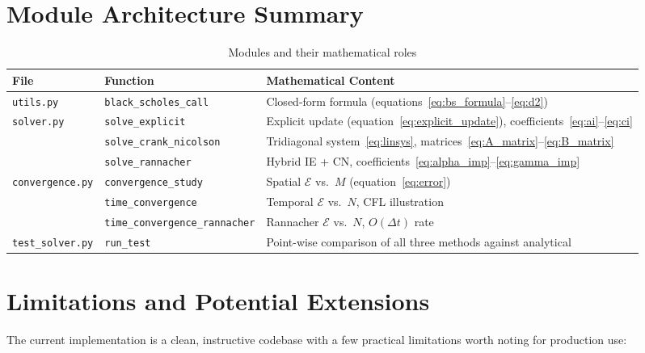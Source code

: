 \documentclass[12pt, a4paper]{article}
\begin{document}
\section{Module Architecture Summary}

\begin{table}[H]
\centering
\caption{Modules and their mathematical roles}
\begin{tabular}{llp{8.5cm}}
\toprule
\textbf{File} & \textbf{Function} & \textbf{Mathematical Content} \\
\midrule
\texttt{utils.py} & \texttt{black\_scholes\_call} & Closed-form formula (equations~\ref{eq:bs_formula}--\ref{eq:d2}) \\
\texttt{solver.py} & \texttt{solve\_explicit} & Explicit update (equation~\ref{eq:explicit_update}), coefficients~\eqref{eq:ai}--\eqref{eq:ci} \\
& \texttt{solve\_crank\_nicolson} & Tridiagonal system~\eqref{eq:linsys}, matrices~\eqref{eq:A_matrix}--\eqref{eq:B_matrix} \\
& \texttt{solve\_rannacher} & Hybrid IE + CN, coefficients~\eqref{eq:alpha_imp}--\eqref{eq:gamma_imp} \\
\texttt{convergence.py} & \texttt{convergence\_study} & Spatial $\mathcal{E}$ vs.\ $M$ (equation~\ref{eq:error}) \\
& \texttt{time\_convergence} & Temporal $\mathcal{E}$ vs.\ $N$, CFL illustration \\
& \texttt{time\_convergence\_rannacher} & Rannacher $\mathcal{E}$ vs.\ $N$, $O(\Delta t)$ rate \\
\texttt{test\_solver.py} & \texttt{run\_test} & Point-wise comparison of all three methods against analytical \\
\bottomrule
\end{tabular}
\end{table}

\section{Limitations and Potential Extensions}

The current implementation is a clean, instructive codebase with a few
practical limitations worth noting for production use:
\end{document}
